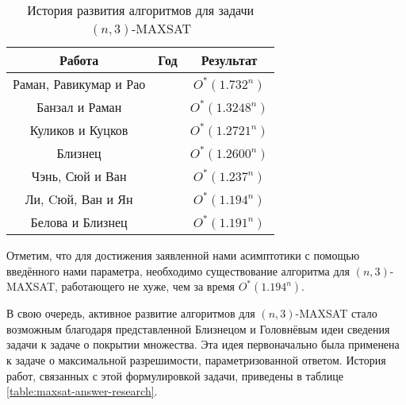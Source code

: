 \begin{table}[ht]
 \caption{История развития алгоритмов для задачи $(n,3)$-MAXSAT}
 \centering
 \begin{tabular}{|c|c|c|}
  \hline
  \textbf{Работа} & \textbf{Год} & \textbf{Результат} \\
  \hline
  Раман, Равикумар и Рао \cite{raman1998simplified} & \citeyear{raman1998simplified} & $O^*(1.732^n)$ \\
  Банзал и Раман \cite{bansal99} & \citeyear{bansal99} & $O^*(1.3248^n)$ \\
  Куликов и Куцков \cite{kulikov2009new} & \citeyear{kulikov2009new} & $O^*(1.2721^n)$ \\
  Близнец \cite{bliznets2013new} & \citeyear{bliznets2013new} & $O^*(1.2600^n)$ \\
  Чэнь, Сюй и Ван \cite{chen15} & \citeyear{chen15} & $O^*(1.237^n)$ \\
  Ли, Cюй, Ван и Ян \cite{li2017improved} & \citeyear{li2017improved} & $O^*(1.194^n)$ \\
  Белова и Близнец \cite{belova18} & \citeyear{belova18} & $O^*(1.191^n)$ \\
  \hline
 \end{tabular}
 \label{table:n3-maxsat-research}
\end{table}

Отметим, что для достижения заявленной нами асимптотики с помощью введённого нами параметра, необходимо существование алгоритма для $(n,3)$-MAXSAT, работающего не хуже, чем за время $O^*(1.194^n)$.

В свою очередь, активное развитие алгоритмов для $(n,3)$-MAXSAT стало возможным благодаря представленной Близнецом и Головнёвым \cite{bliznets12} идеи сведения задачи к задаче о покрытии множества. Эта идея первоначально была применена к задаче о максимальной разрешимости, параметризованной ответом. История работ, связанных с этой формулировкой задачи, приведены в таблице \ref{table:maxsat-answer-research}.

